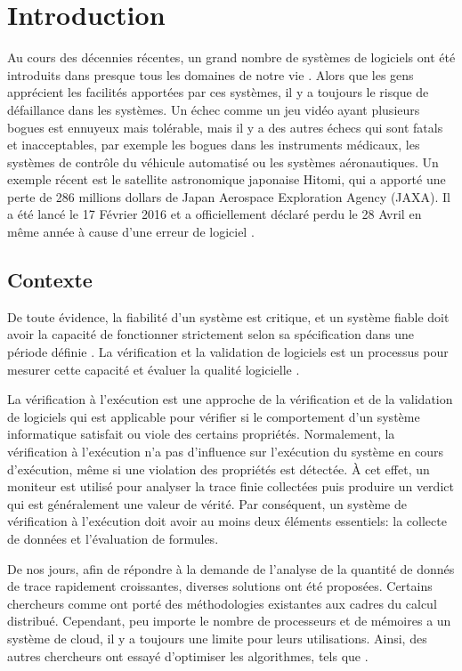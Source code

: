 
\chapter{Introduction}

Au cours des décennies récentes, un grand nombre de systèmes de logiciels ont été introduits dans presque tous les domaines de notre vie \citep{clarke1999model}. Alors que les gens apprécient les facilités apportées par ces systèmes, il y a toujours le risque de défaillance dans les systèmes. Un échec comme un jeu vidéo ayant plusieurs bogues est ennuyeux mais tolérable, mais il y a des autres échecs qui sont fatals et inacceptables, par exemple les bogues dans les instruments médicaux, les systèmes de contrôle du véhicule automatisé ou les systèmes aéronautiques. Un exemple récent est le satellite astronomique japonaise Hitomi, qui a apporté une perte de 286 millions dollars de Japan Aerospace Exploration Agency (JAXA). Il a été lancé le 17 Février 2016 et a officiellement déclaré perdu le 28 Avril en même année à cause d'une erreur de logiciel \citep{nature2016}.

\section{Contexte}

De toute évidence, la fiabilité d'un système est critique, et un système fiable doit avoir la capacité de fonctionner strictement selon sa spécification dans une période définie \citep{avivzienis2004basic}. La vérification et la validation de logiciels est un processus pour mesurer cette capacité et évaluer la qualité logicielle \citep{ieeestd2012}.

La vérification à l'exécution \citep{leucker2009brief} est une approche de la vérification et de la validation de logiciels qui est applicable pour vérifier si le comportement d'un système informatique satisfait ou viole des certains propriétés. Normalement, la vérification à l'exécution n'a pas d'influence sur l'exécution du système en cours d'exécution, même si une violation des propriétés est détectée. À cet effet, un moniteur est utilisé pour analyser la trace finie collectées puis produire un verdict qui est généralement une valeur de vérité. Par conséquent, un système de vérification à l'exécution doit avoir au moins deux éléments essentiels: la collecte de données et l'évaluation de formules.

De nos jours, afin de répondre à la demande de l'analyse de la quantité de donnés de trace rapidement croissantes, diverses solutions ont été proposées. Certains chercheurs comme \cite{barre2012mapreduce} ont porté des méthodologies existantes aux cadres du calcul distribué. Cependant, peu importe le nombre de processeurs et de mémoires a un système de cloud, il y a toujours une limite pour leurs utilisations. Ainsi, des autres chercheurs ont essayé d'optimiser les algorithmes, tels que \cite{havelund2001monitoring}.

